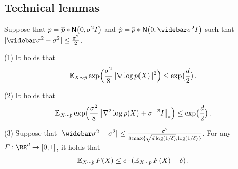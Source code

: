 \subsection{Technical lemmas}\label{appdx:lemmas}







\begin{proposition}\label{prop:nabla-p-MGF}
Suppose that $p=\pbar*\Nsigma$ and $\breve p=\pbar*\normal{0,\sigbar^2\Id}$ such that $\abs{\sigbar^2-\sigma^2}\leq \frac{\sigma^2}{2}$. 

(1) It holds that
\begin{align*}
    \En_{X\sim \breve p} \exp\prn[\Big]{ \frac{\sigma^2}{8}\nrm{\nabla \log p(X)}^2} \leq \exp\prn[\big]{\frac{d}{2}}\,.
\end{align*}

(2) It holds that
\begin{align*}
    \En_{X\sim \breve p} \exp\prn[\Big]{ \frac{\sigma^2}{8}\nrmnuc*{\nabla^2 \log p(X)+\sigma^{-2}\Id}} \leq \exp\prn[\big]{\frac{d}{2}}\,.
\end{align*}

(3) Suppose that $\abs{\sigbar^2-\sigma^2}\leq \frac{\sigma^2}{8\max\crl{\sqrt{d\log(1/\delta)},\log(1/\delta)}}$. For any $F:\RR^d\to [0,1]$, it holds that
\begin{align*}
    \En_{X\sim \breve p} F(X)
    \leq e\cdot (\En_{X\sim p} F(X)+\delta)\,.
\end{align*}
\end{proposition}
